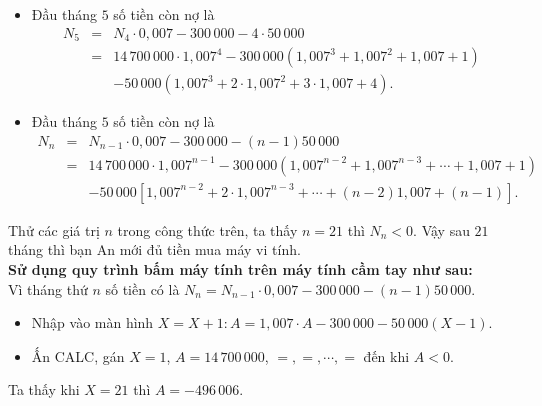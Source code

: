 \begin{ex}
{\begin{enumerate}
\begin{itemize}
\begin{eqnarray*}
&=&  14\,700\,000\cdot1{,}007^3-300\,000(1{,}007^2+1{,}007^2+1)\\
& &- 50\,000(1{,}007^2+2\cdot1{,}007+3).
\end{eqnarray*}
\item Đầu tháng $5$ số tiền còn nợ là
\begin{eqnarray*}
N_5
&=&N_4\cdot0{,}007-300\,000-4\cdot50\,000\\
&=&  14\,700\,000\cdot1{,}007^4-300\,000(1{,}007^3+1{,}007^2+1{,}007+1)\\
&& -50\,000(1{,}007^3+2\cdot1{,}007^2+3\cdot1{,}007+4).
\end{eqnarray*}
\item Đầu tháng $5$ số tiền còn nợ là
\begin{eqnarray*}
N_n
&=&N_{n-1}\cdot0{,}007-300\,000-(n-1)50\,000\\
&=&  14\,700\,000\cdot1{,}007^{n-1}-300\,000(1{,}007^{n-2}+1{,}007^{n-3}+\cdots+1{,}007+1)\\
&& -50\,000\left[1{,}007^{n-2}+2\cdot1{,}007^{n-3}+\cdots+(n-2)1{,}007+(n-1)\right].
\end{eqnarray*}
\end{itemize}
Thử các giá trị $n$ trong công thức trên, ta thấy $n=21$ thì $N_n<0$. Vậy sau $21$ tháng thì bạn An mới đủ tiền mua máy vi tính.\\
{\bf Sử dụng quy trình bấm máy tính trên máy tính cầm tay như sau:}\\
Vì tháng thứ $n$ số tiền có là
$N_n=N_{n-1}\cdot0{,}007-300\,000-(n-1)50\,000$.
\begin{itemize}
\item Nhập vào màn hình $X=X+1\colon A=1{,}007\cdot A-300\,000-50\,000(X-1)$.
\item Ấn CALC, gán $X=1$, $A=14\,700\,000$, $=, =, \cdots, =$ đến khi $A<0$.
\end{itemize}
Ta thấy khi $X=21$ thì $A=-496\,006$.
\end{enumerate}


}
\end{ex}